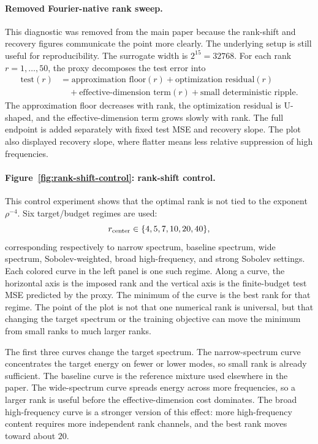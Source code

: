 \paragraph{Removed Fourier-native rank sweep.}
This diagnostic was removed from the main paper because the rank-shift and recovery figures communicate the point more clearly. The underlying setup is still useful for reproducibility. The surrogate width is $2^{15}=32768$. For each rank $r=1,\ldots,50$, the proxy decomposes the test error into
\begin{align}
\text{test}(r)
&=
\text{approximation floor}(r)
+\text{optimization residual}(r)
\nonumber\\
&\quad
+\text{effective-dimension term}(r)
+\text{small deterministic ripple}.
\end{align}
The approximation floor decreases with rank, the optimization residual is U-shaped, and the effective-dimension term grows slowly with rank. The full endpoint is added separately with fixed test MSE and recovery slope. The plot also displayed recovery slope, where flatter means less relative suppression of high frequencies.

\paragraph{Figure~\ref{fig:rank-shift-control}: rank-shift control.}
This control experiment shows that the optimal rank is not tied to the exponent $\rho^{-4}$. Six target/budget regimes are used:
\begin{equation}
r_{\rm center}\in\{4,5,7,10,20,40\},
\end{equation}
corresponding respectively to narrow spectrum, baseline spectrum, wide spectrum, Sobolev-weighted, broad high-frequency, and strong Sobolev settings. Each colored curve in the left panel is one such regime. Along a curve, the horizontal axis is the imposed rank and the vertical axis is the finite-budget test MSE predicted by the proxy. The minimum of the curve is the best rank for that regime. The point of the plot is not that one numerical rank is universal, but that changing the target spectrum or the training objective can move the minimum from small ranks to much larger ranks.

The first three curves change the target spectrum. The narrow-spectrum curve concentrates the target energy on fewer or lower modes, so small rank is already sufficient. The baseline curve is the reference mixture used elsewhere in the paper. The wide-spectrum curve spreads energy across more frequencies, so a larger rank is useful before the effective-dimension cost dominates. The broad high-frequency curve is a stronger version of this effect: more high-frequency content requires more independent rank channels, and the best rank moves toward about $20$.

